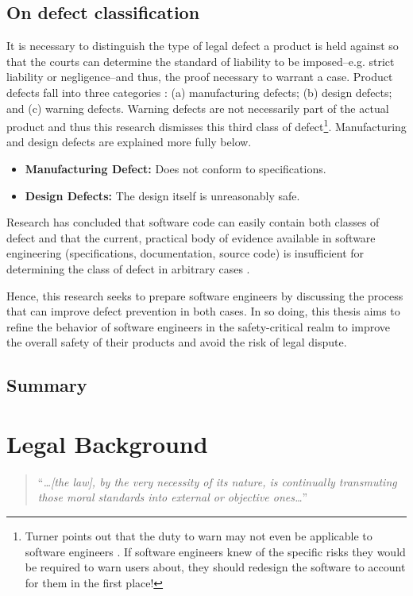 \documentclass[12pt]{report}
\begin{document}
\section{On defect classification}
It is necessary to distinguish the type of legal defect a product is held against so that the courts can determine the standard of liability to be imposed--e.g. strict liability or negligence--and thus, the proof necessary to warrant a case. Product defects fall into three categories \cite{Rest3d}: (a) manufacturing defects; (b) design defects; and (c) warning defects. Warning defects are not necessarily part of the actual product and thus this research dismisses this third class of defect\footnote{Turner points out that the duty to warn may not even be applicable to software engineers \cite{Turner99}. If software engineers knew of the specific risks they would be required to warn users about, they should redesign the software to account for them in the first place!}. Manufacturing and design defects are explained more fully below.
\begin{itemize}
\item\textbf{Manufacturing Defect:} Does not conform to specifications.
\item\textbf{Design Defects:} The design itself is unreasonably safe.
\end{itemize}
Research has concluded that software code can easily contain both classes of defect and that the current, practical body of evidence available in software engineering (specifications, documentation, source code) is insufficient for determining the class of defect in arbitrary cases \cite{Turner99}.

Hence, this research seeks to prepare software engineers by discussing the process that can improve defect prevention in both cases. In so doing, this thesis aims to refine the behavior of software engineers in the safety-critical realm to improve the overall safety of their products and avoid the risk of legal dispute.

\section{Summary}

\chapter{Legal Background} 

\begin{quote}
``\textit{\ldots [the law], by the very necessity of its nature, is continually transmuting those moral standards into external or objective ones\ldots}''
\end{quote}
\end{document}
